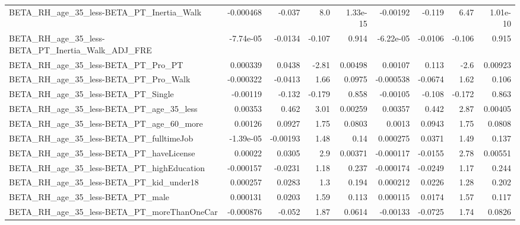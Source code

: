\begin{tabular}{lrrrrrrrr}
BETA\_RH\_age\_35\_less-BETA\_PT\_Inertia\_Walk           &   -0.000468 &       -0.037 &      8.0 & 1.33e-15 &   -0.00192 &      -0.119 &         6.47 &      1.01e-10 \\
BETA\_RH\_age\_35\_less-BETA\_PT\_Inertia\_Walk\_ADJ\_FRE   &   -7.74e-05 &      -0.0134 &   -0.107 &    0.914 &  -6.22e-05 &     -0.0106 &       -0.106 &         0.915 \\
BETA\_RH\_age\_35\_less-BETA\_PT\_Pro\_PT                 &    0.000339 &       0.0438 &    -2.81 &  0.00498 &    0.00107 &       0.113 &         -2.6 &       0.00923 \\
BETA\_RH\_age\_35\_less-BETA\_PT\_Pro\_Walk               &   -0.000322 &      -0.0413 &     1.66 &   0.0975 &  -0.000538 &     -0.0674 &         1.62 &         0.106 \\
BETA\_RH\_age\_35\_less-BETA\_PT\_Single                 &    -0.00119 &       -0.132 &   -0.179 &    0.858 &   -0.00105 &      -0.108 &       -0.172 &         0.863 \\
BETA\_RH\_age\_35\_less-BETA\_PT\_age\_35\_less            &     0.00353 &        0.462 &     3.01 &  0.00259 &    0.00357 &       0.442 &         2.87 &       0.00405 \\
BETA\_RH\_age\_35\_less-BETA\_PT\_age\_60\_more            &     0.00126 &       0.0927 &     1.75 &   0.0803 &     0.0013 &      0.0943 &         1.75 &        0.0808 \\
BETA\_RH\_age\_35\_less-BETA\_PT\_fulltimeJob            &   -1.39e-05 &     -0.00193 &     1.48 &     0.14 &   0.000275 &      0.0371 &         1.49 &         0.137 \\
BETA\_RH\_age\_35\_less-BETA\_PT\_haveLicense            &     0.00022 &       0.0305 &      2.9 &  0.00371 &  -0.000117 &     -0.0155 &         2.78 &       0.00551 \\
BETA\_RH\_age\_35\_less-BETA\_PT\_highEducation          &   -0.000157 &      -0.0231 &     1.18 &    0.237 &  -0.000174 &     -0.0249 &         1.17 &         0.244 \\
BETA\_RH\_age\_35\_less-BETA\_PT\_kid\_under18            &    0.000257 &       0.0283 &      1.3 &    0.194 &   0.000212 &      0.0226 &         1.28 &         0.202 \\
BETA\_RH\_age\_35\_less-BETA\_PT\_male                   &    0.000131 &       0.0203 &     1.59 &    0.113 &   0.000115 &      0.0174 &         1.57 &         0.117 \\
BETA\_RH\_age\_35\_less-BETA\_PT\_moreThanOneCar         &   -0.000876 &       -0.052 &     1.87 &   0.0614 &   -0.00133 &     -0.0725 &         1.74 &        0.0826 \\

\end{tabular}
